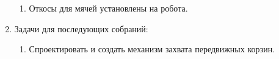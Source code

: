 \begin{enumerate}
\begin{enumerate}
      \item Откосы для мячей установлены на робота.
      
    \end{enumerate}
    
	\item Задачи для последующих собраний:
	\begin{enumerate}
	  \item Спроектировать и создать механизм захвата передвижных корзин.
	  
    \end{enumerate}     
\end{enumerate}
\fillpage
